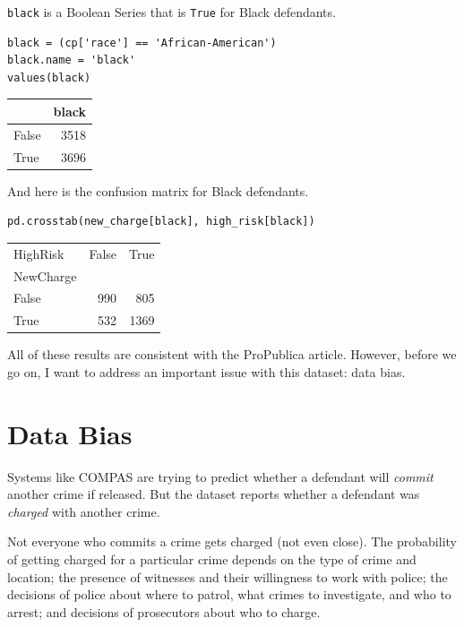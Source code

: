\passthrough{\lstinline!black!} is a Boolean Series that is
\passthrough{\lstinline!True!} for Black defendants.

\begin{lstlisting}[]
black = (cp['race'] == 'African-American')
black.name = 'black'
values(black)
\end{lstlisting}

\begin{tabular}{lr}
\midrule
{} &  black \\
\midrule
False &   3518 \\
True  &   3696 \\
\midrule
\end{tabular}

And here is the confusion matrix for Black defendants.

\begin{lstlisting}[]
pd.crosstab(new_charge[black], high_risk[black])
\end{lstlisting}

\begin{tabular}{lrr}
\midrule
HighRisk &  False &  True  \\
NewCharge &        &        \\
\midrule
False     &    990 &    805 \\
True      &    532 &   1369 \\
\midrule
\end{tabular}

All of these results are consistent with the ProPublica article.
However, before we go on, I want to address an important issue with this
dataset: data bias.

\hypertarget{data-bias}{%
\section{Data Bias}\label{data-bias}}

Systems like COMPAS are trying to predict whether a defendant will
\emph{commit} another crime if released. But the dataset reports whether
a defendant was \emph{charged} with another crime.

Not everyone who commits a crime gets charged (not even close). The
probability of getting charged for a particular crime depends on the
type of crime and location; the presence of witnesses and their
willingness to work with police; the decisions of police about where to
patrol, what crimes to investigate, and who to arrest; and decisions of
prosecutors about who to charge.

